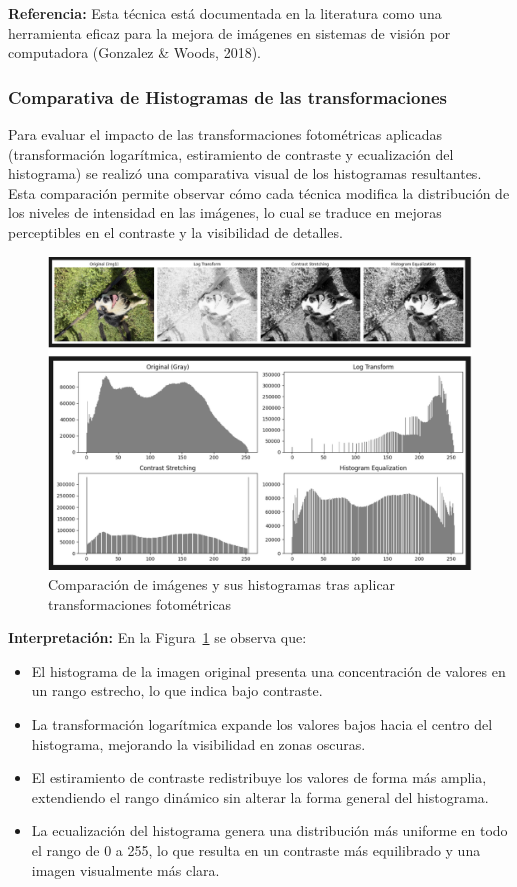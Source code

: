 \documentclass[12pt,letterpaper]{article}
\begin{document}
\textbf{Referencia:} Esta técnica está documentada en la literatura como una herramienta eficaz para la mejora de imágenes en sistemas de visión por computadora (Gonzalez & Woods, 2018).

\subsubsection{Comparativa de Histogramas de las transformaciones}

Para evaluar el impacto de las transformaciones fotométricas aplicadas (transformación logarítmica, estiramiento de contraste y ecualización del histograma) se realizó una comparativa visual de los histogramas resultantes. Esta comparación permite observar cómo cada técnica modifica la distribución de los niveles de intensidad en las imágenes, lo cual se traduce en mejoras perceptibles en el contraste y la visibilidad de detalles.

\begin{figure}[H]
  \centering
  \includegraphics[width=0.8\linewidth]{figuras/comparacion_transformaciones.png}
  \caption{Comparación de imágenes y sus histogramas tras aplicar transformaciones fotométricas}
  \label{fig:comparacion_transformaciones}
\end{figure}

\textbf{Interpretación:} En la Figura~\ref{fig:comparacion_transformaciones} se observa que:

\begin{itemize}
    \item El histograma de la imagen original presenta una concentración de valores en un rango estrecho, lo que indica bajo contraste.
    \item La transformación logarítmica expande los valores bajos hacia el centro del histograma, mejorando la visibilidad en zonas oscuras.
    \item El estiramiento de contraste redistribuye los valores de forma más amplia, extendiendo el rango dinámico sin alterar la forma general del histograma.
    \item La ecualización del histograma genera una distribución más uniforme en todo el rango de 0 a 255, lo que resulta en un contraste más equilibrado y una imagen visualmente más clara.
\end{itemize}
\end{document}
